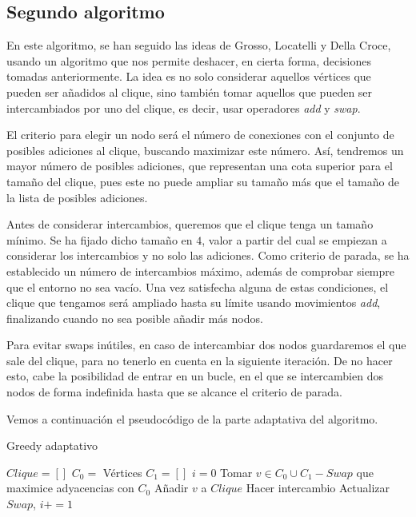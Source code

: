\subsection{Segundo algoritmo}

En este algoritmo, se han seguido las ideas de Grosso, Locatelli y Della Croce, usando un algoritmo
que nos permite deshacer, en cierta forma, decisiones tomadas anteriormente. La idea es no solo
considerar aquellos vértices que pueden ser añadidos al clique, sino también tomar aquellos que
pueden ser intercambiados por uno del clique, es decir, usar operadores \textit{add} y \textit{swap}.

El criterio para elegir un nodo será el número de conexiones con el conjunto de posibles adiciones
al clique, buscando maximizar este número. Así, tendremos un mayor número de posibles adiciones, que
representan una cota superior para el tamaño del clique, pues este no puede ampliar su tamaño
más que el tamaño de la lista de posibles adiciones.

Antes de considerar intercambios, queremos que el clique tenga un tamaño mínimo. Se ha fijado
dicho tamaño en $4$, valor a partir del cual se empiezan a considerar los intercambios y no
solo las adiciones. Como criterio de parada, se ha establecido un número de intercambios máximo,
además de comprobar siempre que el entorno no sea vacío. Una vez satisfecha alguna de estas
condiciones, el clique que tengamos será ampliado hasta su límite usando movimientos \textit{add},
finalizando cuando no sea posible añadir más nodos.

Para evitar swaps inútiles, en caso de intercambiar dos nodos guardaremos el que
sale del clique, para no tenerlo en cuenta en la siguiente iteración. De no hacer esto, cabe la
posibilidad de entrar en un bucle, en el que se intercambien dos nodos de forma indefinida
hasta que se alcance el criterio de parada.

Vemos a continuación el pseudocódigo de la parte adaptativa del algoritmo.


\begin{algorithm}[H]
\caption{Greedy adaptativo}
  \begin{algorithmic}
  \State $Clique = [ ]$
  \State $C_0 = $ Vértices
  \State $C_1 = [ ]$
  \State $i = 0$
  \Repeat
    \State Tomar $v \in C_0 \cup C_1 - Swap$ que maximice adyacencias con $C_0$
      \State Añadir $v$ a $Clique$
    \Else
      \State Hacer intercambio
      \State Actualizar $Swap$, $i += 1$
    \EndIf
  \end{algorithmic}
\end{algorithm}


